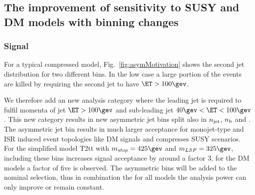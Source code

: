 \subsection{The improvement of sensitivity to SUSY and DM models with binning changes}

\subsubsection{Signal }\label{sec:asym_bin}

For a typical compressed model, Fig.~\ref{fig:asymMotivation} shows the second jet \PT
distribution for two different \HT bins. In the low \HT case a large portion of
the events are killed by requiring the second jet to have $\ET>100\gev$. 

We therefore add an new analysis category where the leading jet is required to fulfil 
momenta of jet $\ET>100\gev$ and sub-leading jet $40\gev<\ET<100\gev$. This new category 
results in new asymmetric jet bins split also in $n_{\text{jet}}$, $n_{\text{b}}$ and \HT. The asymmetric jet bin
results in much larger acceptance for monojet-type and ISR induced event topologies like DM signals
and compresses SUSY scenarios. 
For the simplified model T2tt with $m_{stop}=425\gev$ and $m_{LSP}=325\gev$, 
including these bins increases signal acceptance by around a factor 3, for the DM models a factor of five is observed.
The asymmetric bins will be added to the nominal selection, thus in combination the for all models the analysis power can only improve or remain constant.
